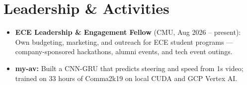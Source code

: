 \documentclass[11pt, letterpaper]{article}
\begin{document}
\section{Leadership \& Activities}
\begin{itemize}
  \item \textbf{ECE Leadership \& Engagement Fellow} (CMU, Aug 2026 -- present): Own budgeting, marketing, and outreach for ECE student programs --- company-sponsored hackathons, alumni events, and tech event outings.
  \item \textbf{my-av:} Built a CNN-GRU that predicts steering and speed from 1s video; trained on 33 hours of Comma2k19 on local CUDA and GCP Vertex AI.
\end{itemize}
\end{document}
